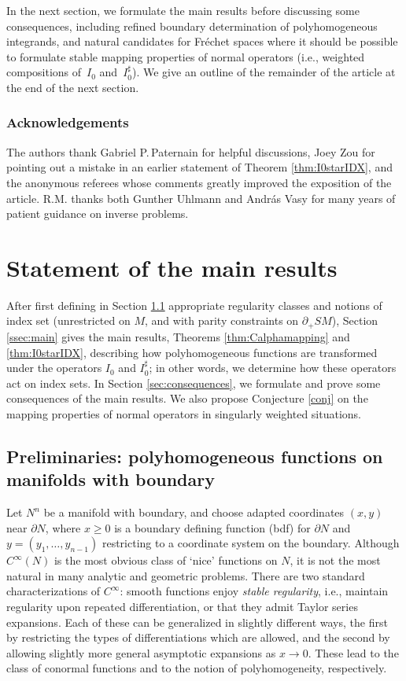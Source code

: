 \documentclass[11pt]{article}
\newcommand{\ie}{i.e.,\xspace}
\newcommand{\Subsection}{\subsection}
\theoremstyle{plain}
\theoremstyle{definition}
\theoremstyle{remark}
\newcommand{\adj}{I_0^\sharp}
\newcommand{\del}{\partial}
\begin{document}
In the next section, we formulate the main results before discussing some consequences, including refined boundary determination of polyhomogeneous integrands, and natural candidates for Fréchet spaces where it should be possible to formulate stable mapping properties of normal operators (\ie weighted compositions of~$I_0$ and~$\adj$). We give an outline of the remainder of the article at the end of the next section.

\subsubsection*{Acknowledgements} The authors thank Gabriel P.\,Paternain for helpful discussions, Joey Zou for pointing out a mistake in an earlier statement of Theorem \ref{thm:I0starIDX}, and the anonymous referees whose comments greatly improved the exposition of the article. R.M. thanks both Gunther Uhlmann and András Vasy for many years of patient guidance on inverse problems.

\section{Statement of the main results} \label{sec:main}

After first defining in Section \ref{sec:prelim} appropriate regularity classes and notions of index set (unrestricted on $M$, and with parity constraints on $\partial_+ SM$), Section \ref{ssec:main} gives the main results, Theorems \ref{thm:Calphamapping} and \ref{thm:I0starIDX}, describing how polyhomogeneous functions are transformed under the operators $I_0$ and $\adj $; in other words, we determine how these operators act on index sets. In Section \ref{sec:consequences}, we formulate and prove some consequences of the main results. We also propose Conjecture \ref{conj} on the mapping properties of normal operators in singularly weighted situations.

\Subsection{Preliminaries: polyhomogeneous functions on manifolds with boundary} \label{sec:prelim}

Let $N^n$ be a manifold with boundary, and choose adapted coordinates $(x,y)$ near $\partial N$, where $x \geq 0$ is a boundary defining function (bdf) for $\del N$ and $y = (y_1, \dots, y_{n-1})$ restricting to a coordinate system on the boundary. Although $C^\infty(N)$ is the most obvious class of `nice' functions on $N$, it is not the most natural in many analytic and geometric problems. There are two standard characterizations of $C^\infty$: smooth functions enjoy {\it stable regularity}, \ie maintain regularity upon repeated differentiation, or that they admit Taylor series expansions. Each of these can be generalized in slightly different ways, the first by restricting the types of differentiations which are allowed, and the second by allowing slightly more general asymptotic expansions as $x \to 0$. These lead to the class of conormal functions and to the notion of polyhomogeneity, respectively.
\end{document}

